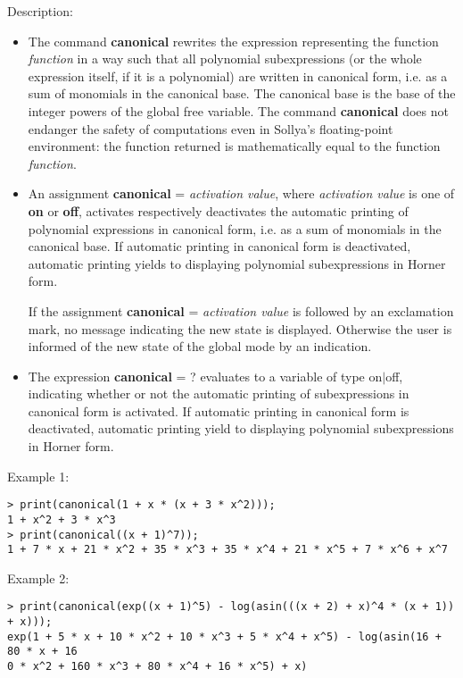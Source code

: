 \noindent Description: \begin{itemize}

\item The command \textbf{canonical} rewrites the expression representing the function
   \emph{function} in a way such that all polynomial subexpressions (or the
   whole expression itself, if it is a polynomial) are written in
   canonical form, i.e. as a sum of monomials in the canonical base. The
   canonical base is the base of the integer powers of the global free
   variable. The command \textbf{canonical} does not endanger the safety of
   computations even in Sollya's floating-point environment: the
   function returned is mathematically equal to the function \emph{function}.

\item An assignment \textbf{canonical} = \emph{activation value}, where \emph{activation value}
   is one of \textbf{on} or \textbf{off}, activates respectively deactivates the
   automatic printing of polynomial expressions in canonical form,
   i.e. as a sum of monomials in the canonical base. If automatic
   printing in canonical form is deactivated, automatic printing yields to
   displaying polynomial subexpressions in Horner form.
    
   If the assignment \textbf{canonical} = \emph{activation value} is followed by an
   exclamation mark, no message indicating the new state is
   displayed. Otherwise the user is informed of the new state of the
   global mode by an indication.

\item The expression \textbf{canonical} = ? evaluates to a variable of type
   \textsf{on$|$off}, indicating whether or not the automatic printing of
   subexpressions in canonical form is activated. If automatic printing
   in canonical form is deactivated, automatic printing yield to
   displaying polynomial subexpressions in Horner form.
\end{itemize}
\noindent Example 1: 
\begin{center}\begin{minipage}{15cm}\begin{Verbatim}[frame=single]
> print(canonical(1 + x * (x + 3 * x^2)));
1 + x^2 + 3 * x^3
> print(canonical((x + 1)^7));
1 + 7 * x + 21 * x^2 + 35 * x^3 + 35 * x^4 + 21 * x^5 + 7 * x^6 + x^7
\end{Verbatim}
\end{minipage}\end{center}
\noindent Example 2: 
\begin{center}\begin{minipage}{15cm}\begin{Verbatim}[frame=single]
> print(canonical(exp((x + 1)^5) - log(asin(((x + 2) + x)^4 * (x + 1)) + x)));
exp(1 + 5 * x + 10 * x^2 + 10 * x^3 + 5 * x^4 + x^5) - log(asin(16 + 80 * x + 16
0 * x^2 + 160 * x^3 + 80 * x^4 + 16 * x^5) + x)
\end{Verbatim}
\end{minipage}\end{center}
